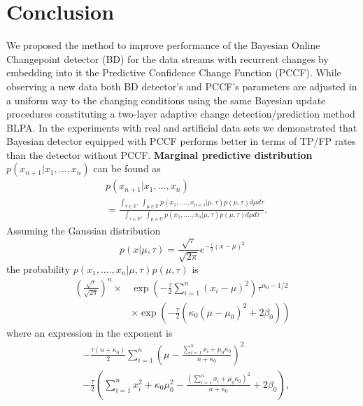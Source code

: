 \section{Conclusion}
We proposed the method to improve performance of the Bayesian Online Changepoint detector (BD) for the data streams with recurrent changes by embedding into it the Predictive Confidence Change Function (PCCF).
%
While observing a new data both BD detector's and PCCF's parameters are adjusted in a uniform way to the changing conditions using the same Bayesian update procedures constituting a two-layer adaptive change detection/prediction method BLPA.
%
In the experiments with real and artificial data sets we demonstrated that Bayesian detector equipped with PCCF performs better in terms of TP/FP rates than the detector without PCCF.
%
%
\appendix
\noindent
\textbf{Marginal predictive distribution} $p(x_{n+1}|x_1,...,x_n)$ can be found as
\begin{align}
\label{eq:post1}
    &p(x_{n+1}|x_1,...,x_n)\\\nonumber
    &=\frac{ \int_{\tau\in \mathbb{R}^+} \int_{\mu\in \mathbb{R}}p(x_1,....,x_{n+1}|\mu,\tau) p(\mu,\tau)d\mu d\tau}{ \int_{\tau\in \mathbb{R}^+} \int_{\mu\in\mathbb{R}}p(x_1,....,x_{n}|\mu,\tau) p(\mu,\tau)d\mu d\tau}.
\end{align}
Assuming the Gaussian distribution 
\begin{equation}
    p(x|\mu,\tau)=\frac{\sqrt{\tau}}{\sqrt{2\pi}} e^{-\frac{\tau}2 (x-\mu)^2}
    \label{eq:gauss_appendix}
\end{equation}
the probability $p(x_1,....,x_{n}|\mu,\tau) p(\mu,\tau)$ is
\begin{align}\label{eq:prob1}
    \left(\frac{\sqrt{\tau}}{\sqrt{2\pi}}\right)^{n}\times &\exp\left(-\frac{\tau}{2}\sum_{i=1}^{n} (x_i-\mu)^2\right) \tau^{\alpha_0-1/2}\\\nonumber &\times\exp\left(-\frac{\tau}2 \left(\kappa_0(\mu-\mu_0)^2+2\beta_0\right) \right)
\end{align}
where an expression in the exponent is 
\begin{align}
    &-\frac{\tau(n+\kappa_0)}{2}\sum_{i=1}^{n} \left(\mu-\frac{\sum_{i=1}^{n} x_i+\mu_0 \kappa_0}{n+\kappa_0}\right)^2\\\nonumber &-\frac{\tau}{2} \left(\sum_{i=1}^{n} x_i^2 + \kappa_0\mu_0^2 - \frac{(\sum_{i=1}^{n}x_i +\mu_0 \kappa_0)^2}{n+\kappa_0}+2\beta_0\right),
\end{align}
